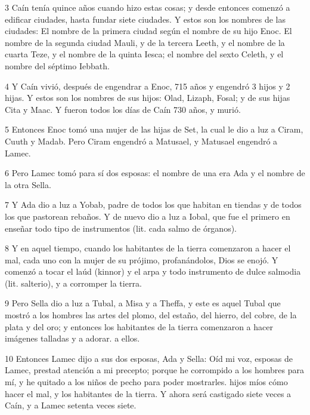 \par 3 Caín tenía quince años cuando hizo estas cosas; y desde entonces comenzó a edificar ciudades, hasta fundar siete ciudades. Y estos son los nombres de las ciudades: El nombre de la primera ciudad según el nombre de su hijo Enoc. El nombre de la segunda ciudad Mauli, y de la tercera Leeth, y el nombre de la cuarta Teze, y el nombre de la quinta Iesca; el nombre del sexto Celeth, y el nombre del séptimo Iebbath.

\par 4 Y Caín vivió, después de engendrar a Enoc, 715 años y engendró 3 hijos y 2 hijas. Y estos son los nombres de sus hijos: Olad, Lizaph, Fosal; y de sus hijas Cita y Maac. Y fueron todos los días de Caín 730 años, y murió.

\par 5 Entonces Enoc tomó una mujer de las hijas de Set, la cual le dio a luz a Ciram, Cuuth y Madab. Pero Ciram engendró a Matusael, y Matusael engendró a Lamec.

\par 6 Pero Lamec tomó para sí dos esposas: el nombre de una era Ada y el nombre de la otra Sella.

\par 7 Y Ada dio a luz a Yobab, padre de todos los que habitan en tiendas y de todos los que pastorean rebaños. Y de nuevo dio a luz a Iobal, que fue el primero en enseñar todo tipo de instrumentos (lit. cada salmo de órganos).

\par 8 Y en aquel tiempo, cuando los habitantes de la tierra comenzaron a hacer el mal, cada uno con la mujer de su prójimo, profanándolos, Dios se enojó. Y comenzó a tocar el laúd (kinnor) y el arpa y todo instrumento de dulce salmodia (lit. salterio), y a corromper la tierra.

\par 9 Pero Sella dio a luz a Tubal, a Misa y a Theffa, y este es aquel Tubal que mostró a los hombres las artes del plomo, del estaño, del hierro, del cobre, de la plata y del oro; y entonces los habitantes de la tierra comenzaron a hacer imágenes talladas y a adorar. a ellos.

\par 10 Entonces Lamec dijo a sus dos esposas, Ada y Sella: Oíd mi voz, esposas de Lamec, prestad atención a mi precepto; porque he corrompido a los hombres para mí, y he quitado a los niños de pecho para poder mostrarles. hijos míos cómo hacer el mal, y los habitantes de la tierra. Y ahora será castigado siete veces a Caín, y a Lamec setenta veces siete.

